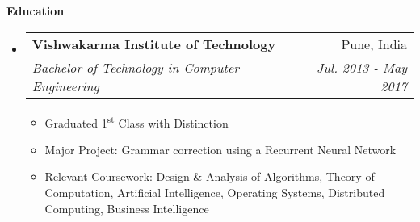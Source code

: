 \documentclass[letterpaper,12pt]{article}
\makeatletter
\newcommand{\ts}{\textsuperscript}
\newcommand{\resitem}[1]{\item #1 \vspace{-2pt}}
\newcommand{\resheading}[1]{{\large \colorbox{mygrey}{\begin{minipage}{\textwidth}{\textbf{#1 \vphantom{p\^{E}}}}\end{minipage}}}}
\newcommand{\ressubheading}[4]{
    \begin{tabular*}{7.0in}{l@{\extracolsep{\fill}}r}
      \textbf{#1} & #2 \\
      \textit{#3} & \textit{#4} \\
    \end{tabular*}\vspace{-6pt}}
\newif\ifhighschool
\makeatother
\begin{document}
  \resheading{Education}
  \begin{itemize}
  \item
    \ressubheading{Vishwakarma Institute of Technology}{Pune, India}{Bachelor of Technology in Computer Engineering}{Jul. 2013 - May 2017}
    \begin{itemize}
      \resitem {Graduated 1\ts{st} Class with Distinction}
      \resitem {Major Project: Grammar correction using a Recurrent Neural Network}
      \resitem{Relevant Coursework: Design \& Analysis of Algorithms, Theory of Computation, Artificial Intelligence, Operating Systems, Distributed Computing, Business Intelligence}
    \end{itemize}
    \ifhighschool	
  \item
    \ressubheading{Delhi Public School}{Pune, India}{12th Grade CBSE}{May 2013}
    \begin{itemize}
      \resitem{Percentage: 76.4\%}
    \end{itemize}
  \item
    \ressubheading{Delhi Public School}{Pune, India}{10th Grade CBSE}{May 2011}
    \begin{itemize}
      \resitem{CGPA: 8.6}
    \end{itemize}
    \fi
  \end{itemize}
  
  \pagebreak
  
\end{document}

